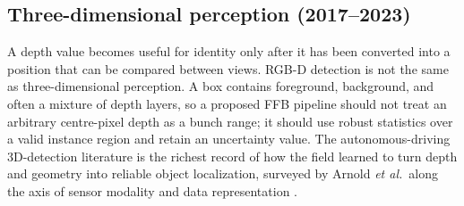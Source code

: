 \subsection{Three-dimensional perception (2017--2023)}

A depth value becomes useful for identity only after it has been converted into a position that can be compared between views. RGB-D detection is not the same as three-dimensional perception. A box contains foreground, background, and often a mixture of depth layers, so a proposed FFB pipeline should not treat an arbitrary centre-pixel depth as a bunch range; it should use robust statistics over a valid instance region and retain an uncertainty value. The autonomous-driving 3D-detection literature is the richest record of how the field learned to turn depth and geometry into reliable object localization, surveyed by Arnold \textit{et al.}\ along the axis of sensor modality and data representation \cite{arnold2019survey3d}.

